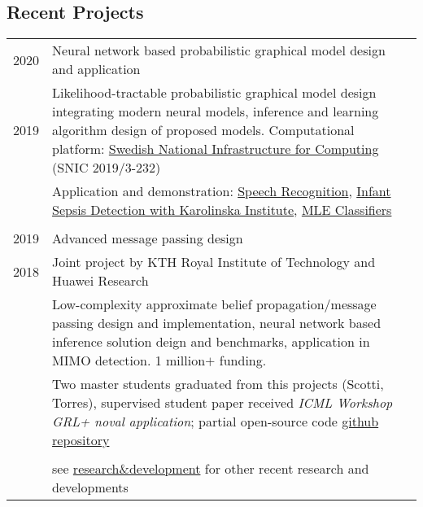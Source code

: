 \documentclass[a4paper,10pt]{article}
\begin{document}

\subsection{Recent Projects}
\begin{tabular}{r|p{13cm}}
\textsc{2020} & Neural network based probabilistic graphical model design and application\\
  \textsc{2019} & Likelihood-tractable probabilistic graphical model design integrating modern neural models, inference and learning algorithm design of proposed models. Computational platform: \href{https://www.snic.se/}{Swedish National Infrastructure for Computing} (SNIC 2019/3-232)\\
              & Application and demonstration: \href{https://github.com/FirstHandScientist/genhmm}{Speech Recognition}, \href{https://arxiv.org/pdf/1910.13904.pdf}{Infant Sepsis Detection with Karolinska Institute}, \href{https://github.com/FirstHandScientist/classification-EM-GM}{MLE Classifiers}\\
    \multicolumn{2}{c}{} \\
  \textsc{2019}  & Advanced message passing design \\
  \textsc{2018}& Joint project by KTH Royal Institute of Technology and Huawei Research\\
              & Low-complexity approximate belief propagation/message passing design and implementation, neural network based inference solution deign and benchmarks, application in MIMO detection. 1 million$+$ funding.\\
              & Two master students graduated from this projects (Scotti, Torres), supervised student paper received \textit{ICML Workshop GRL+ noval application}; partial open-source code \href{https://github.com/FirstHandScientist/amp}{github repository} \\
    \multicolumn{2}{c}{} \\

  & see \href{https://people.kth.se/~doli/#/research}{research\&development} for other recent research and developments\\

\end{tabular}
\end{document}
